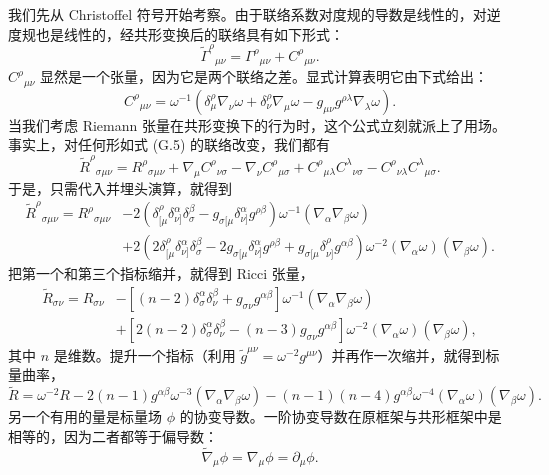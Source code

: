 我们先从 Christoffel 符号开始考察。由于联络系数对度规的导数是线性的，对逆度规也是线性的，经共形变换后的联络具有如下形式：
\begin{equation*}
\widetilde{\Gamma}^{\rho}{}_{\mu\nu} = \Gamma^{\rho}{}_{\mu\nu} + C^{\rho}{}_{\mu\nu}.
\tag{G.5}
\end{equation*}
$C^{\rho}{}_{\mu\nu}$ 显然是一个张量，因为它是两个联络之差。显式计算表明它由下式给出：
\begin{equation*}
C^{\rho}{}_{\mu\nu} = \omega^{-1}\left(\delta^{\rho}_{\mu}\nabla_{\nu}\omega + \delta^{\rho}_{\nu}\nabla_{\mu}\omega - g_{\mu\nu}g^{\rho\lambda}\nabla_{\lambda}\omega\right).
\tag{G.6}
\end{equation*}
当我们考虑 Riemann 张量在共形变换下的行为时，这个公式立刻就派上了用场。事实上，对任何形如式 (G.5) 的联络改变，我们都有
\begin{equation*}
\widetilde{R}^{\rho}{}_{\sigma\mu\nu} = R^{\rho}{}_{\sigma\mu\nu} + \nabla_{\mu}C^{\rho}{}_{\nu\sigma} - \nabla_{\nu}C^{\rho}{}_{\mu\sigma} + C^{\rho}{}_{\mu\lambda}C^{\lambda}{}_{\nu\sigma} - C^{\rho}{}_{\nu\lambda}C^{\lambda}{}_{\mu\sigma}.
\tag{G.7}
\end{equation*}
于是，只需代入并埋头演算，就得到
\begin{align*}
\widetilde{R}^{\rho}{}_{\sigma\mu\nu} = R^{\rho}{}_{\sigma\mu\nu} &- 2\left(\delta^{\rho}_{[\mu}\delta^{\alpha}_{\nu]}\delta^{\beta}_{\sigma} - g_{\sigma[\mu}\delta^{\alpha}_{\nu]}g^{\rho\beta}\right)\omega^{-1}(\nabla_{\alpha}\nabla_{\beta}\omega) \\
&+ 2\left(2\delta^{\rho}_{[\mu}\delta^{\alpha}_{\nu]}\delta^{\beta}_{\sigma} - 2g_{\sigma[\mu}\delta^{\alpha}_{\nu]}g^{\rho\beta} + g_{\sigma[\mu}\delta^{\rho}_{\nu]}g^{\alpha\beta}\right)\omega^{-2}(\nabla_{\alpha}\omega)(\nabla_{\beta}\omega).
\tag{G.8}
\end{align*}
把第一个和第三个指标缩并，就得到 Ricci 张量，
\begin{align*}
\widetilde{R}_{\sigma\nu} = R_{\sigma\nu} &- \left[(n-2)\delta^{\alpha}_{\sigma}\delta^{\beta}_{\nu} + g_{\sigma\nu}g^{\alpha\beta}\right]\omega^{-1}(\nabla_{\alpha}\nabla_{\beta}\omega) \\
&+ \left[2(n-2)\delta^{\alpha}_{\sigma}\delta^{\beta}_{\nu} - (n-3)g_{\sigma\nu}g^{\alpha\beta}\right]\omega^{-2}(\nabla_{\alpha}\omega)(\nabla_{\beta}\omega),
\tag{G.9}
\end{align*}
其中 $n$ 是维数。提升一个指标（利用 $\tilde{g}^{\mu\nu} = \omega^{-2}g^{\mu\nu}$）并再作一次缩并，就得到标量曲率，
\begin{equation*}
\widetilde{R} = \omega^{-2}R - 2(n-1)g^{\alpha\beta}\omega^{-3}(\nabla_{\alpha}\nabla_{\beta}\omega) - (n-1)(n-4)g^{\alpha\beta}\omega^{-4}(\nabla_{\alpha}\omega)(\nabla_{\beta}\omega).
\tag{G.10}
\end{equation*}
另一个有用的量是标量场 $\phi$ 的协变导数。一阶协变导数在原框架与共形框架中是相等的，因为二者都等于偏导数：
\begin{equation*}
\widetilde{\nabla}_{\mu}\phi = \nabla_{\mu}\phi = \partial_{\mu}\phi.
\tag{G.11}
\end{equation*}

